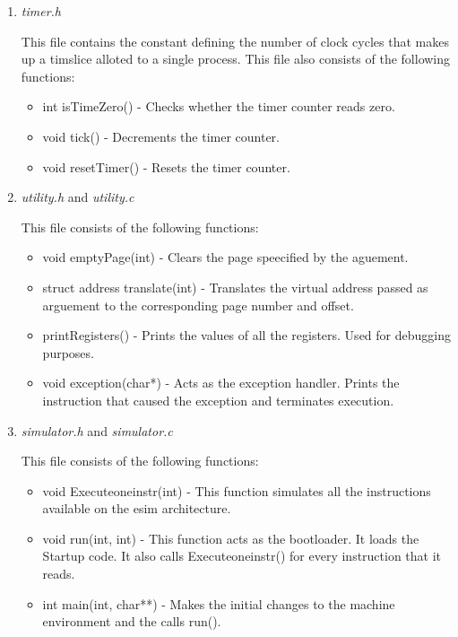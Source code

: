 \begin{enumerate}
	\item \textit{timer.h}
	
	This file contains the constant defining the number of clock cycles that makes up a timslice alloted to a single process. This file also consists of the following functions:
	\begin{itemize}
		\item int isTimeZero() - Checks whether the timer counter reads zero.
		\item void tick() - Decrements the timer counter.
		\item void resetTimer() - Resets the timer counter.
	\end{itemize}
	
	\item \textit{utility.h} and \textit{utility.c}
	
	This file consists of the following functions:
	\begin{itemize}
		\item void emptyPage(int) - Clears the page speecified by the aguement.
		\item struct address translate(int) - Translates the virtual address passed as arguement to the corresponding page number and offset.
		\item printRegisters() - Prints the values of all the registers. Used for debugging purposes.
		\item void exception(char*) - Acts as the exception handler. Prints the instruction that caused the exception and terminates execution.
	\end{itemize}

	\item \textit{simulator.h} and \textit{simulator.c}

	This file consists of the following functions:
	\begin{itemize}
		\item void Executeoneinstr(int) - This function simulates all the instructions available on the esim architecture. 
		\item void run(int, int) - This function acts as the bootloader. It loads the Startup code. It also calls Executeoneinstr() for every instruction that it reads.
		\item int main(int, char**) - Makes the initial changes to the machine environment and the calls run().
	\end{itemize}

\end{enumerate}